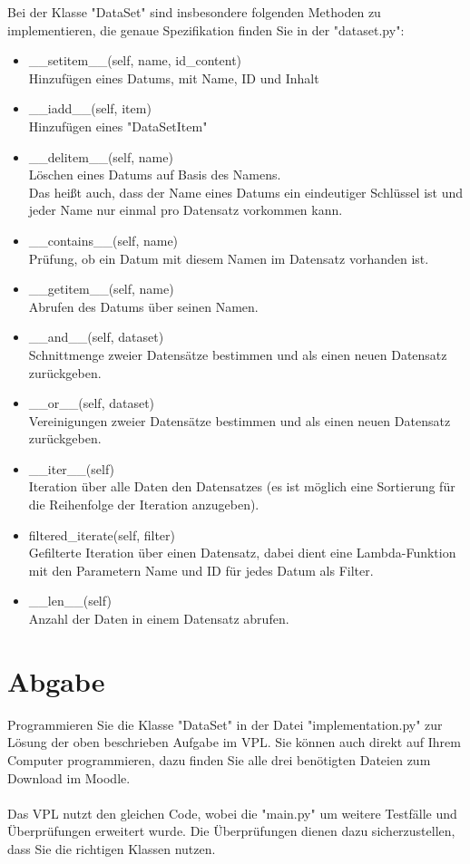 \documentclass{article}
\begin{document}
			Bei der Klasse "DataSet" sind insbesondere folgenden Methoden zu implementieren, die genaue Spezifikation finden Sie in der "dataset.py":\\
			\begin{itemize}
				\item \_\_setitem\_\_(self, name, id\_content)\\
					Hinzufügen eines Datums, mit Name, ID und Inhalt
				\item \_\_iadd\_\_(self, item)\\
					Hinzufügen eines "DataSetItem"
				\item \_\_delitem\_\_(self, name)\\
					Löschen eines Datums auf Basis des Namens.\\
					Das heißt auch, dass der Name eines Datums ein eindeutiger Schlüssel ist und jeder Name nur einmal pro Datensatz vorkommen kann.
				\item \_\_contains\_\_(self, name)\\
					Prüfung, ob ein Datum mit diesem Namen im Datensatz vorhanden ist.
				\item \_\_getitem\_\_(self, name)\\
					Abrufen des Datums über seinen Namen.
				\item \_\_and\_\_(self, dataset)\\
					Schnittmenge zweier Datensätze bestimmen und als einen neuen Datensatz zurückgeben.
				\item \_\_or\_\_(self, dataset)\\
					Vereinigungen zweier Datensätze bestimmen und als einen neuen Datensatz zurückgeben.
				\item \_\_iter\_\_(self)\\
					Iteration über alle Daten den Datensatzes (es ist möglich eine Sortierung für die Reihenfolge der Iteration anzugeben).
				\item filtered\_iterate(self, filter)\\
					Gefilterte Iteration über einen Datensatz, dabei dient eine Lambda-Funktion mit den Parametern Name und ID für jedes Datum als Filter.
				\item \_\_len\_\_(self)\\
					Anzahl der Daten in einem Datensatz abrufen.\\
			\end{itemize}

		\section{Abgabe}
		Programmieren Sie die Klasse "DataSet" in der Datei "implementation.py" zur Lösung der oben beschrieben Aufgabe im VPL.
		Sie können auch direkt auf Ihrem Computer programmieren, dazu finden Sie alle drei benötigten Dateien zum Download im Moodle.\\
		\\
		Das VPL nutzt den gleichen Code, wobei die "main.py" um weitere Testfälle und Überprüfungen erweitert wurde.
		Die Überprüfungen dienen dazu sicherzustellen, dass Sie die richtigen Klassen nutzen.\\
	
\end{document}
